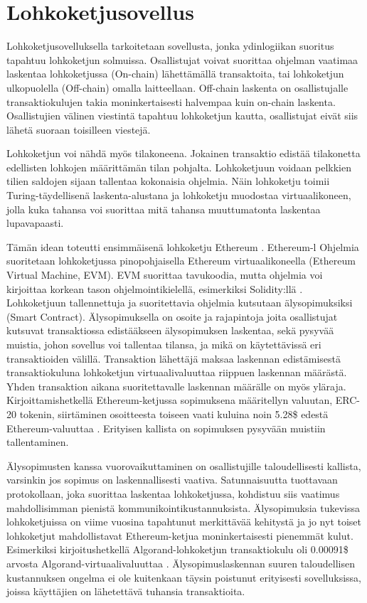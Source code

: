 \section{Lohkoketjusovellus}

Lohkoketjusovelluksella tarkoitetaan sovellusta, jonka ydinlogiikan suoritus tapahtuu lohkoketjun solmuissa. Osallistujat voivat suorittaa ohjelman vaatimaa laskentaa lohkoketjussa (On-chain) lähettämällä transaktoita, tai lohkoketjun ulkopuolella (Off-chain) omalla laitteellaan. Off-chain laskenta on osallistujalle transaktiokulujen takia moninkertaisesti halvempaa kuin on-chain laskenta. Osallistujien välinen viestintä tapahtuu lohkoketjun kautta, osallistujat eivät siis lähetä suoraan toisilleen viestejä.

Lohkoketjun voi nähdä myös tilakoneena. Jokainen transaktio edistää tilakonetta edellisten lohkojen määrittämän tilan pohjalta. Lohkoketjuun voidaan pelkkien tilien saldojen sijaan tallentaa kokonaisia ohjelmia. Näin lohkoketju toimii Turing-täydellisenä laskenta-alustana ja lohkoketju muodostaa virtuaalikoneen, jolla kuka tahansa voi suorittaa mitä tahansa muuttumatonta laskentaa lupavapaasti.

Tämän idean toteutti ensimmäisenä lohkoketju Ethereum \cite{buterin_ethereum_2014}. Ethereum-l
Ohjelmia suoritetaan lohkoketjussa pinopohjaisella Ethereum virtuaalikoneella (Ethereum Virtual Machine, EVM). EVM suorittaa tavukoodia, mutta ohjelmia voi kirjoittaa korkean tason ohjelmointikielellä, esimerkiksi Solidity:llä \cite{noauthor_solidity_nodate}. Lohkoketjuun tallennettuja ja suoritettavia ohjelmia kutsutaan älysopimuksiksi (Smart Contract).  Älysopimuksella on osoite ja rajapintoja joita osallistujat kutsuvat transaktiossa edistääkseen älysopimuksen laskentaa, sekä pysyvää muistia, johon sovellus voi tallentaa tilansa, ja mikä on käytettävissä eri transaktioiden välillä. Transaktion lähettäjä maksaa laskennan edistämisestä transaktiokuluna lohkoketjun virtuaalivaluuttaa riippuen laskennan määrästä. Yhden transaktion aikana suoritettavalle laskennan määrälle on myös yläraja. Kirjoittamishetkellä Ethereum-ketjussa sopimuksena määritellyn valuutan, ERC-20 tokenin, siirtäminen osoitteesta toiseen vaati kuluina noin 5.28\$ edestä Ethereum-valuuttaa \cite{etherscanio_ethereum_nodate}. Erityisen kallista on sopimuksen pysyvään muistiin tallentaminen.

Älysopimusten kanssa vuorovaikuttaminen on osallistujille taloudellisesti kallista, varsinkin jos sopimus on laskennallisesti vaativa. Satunnaisuutta tuottavaan protokollaan, joka suorittaa laskentaa lohkoketjussa, kohdistuu siis vaatimus mahdollisimman pienistä kommunikointikustannuksista. Älysopimuksia tukevissa lohkoketjuissa on viime vuosina tapahtunut merkittävää kehitystä ja jo nyt toiset lohkoketjut mahdollistavat Ethereum-ketjua moninkertaisesti pienemmät kulut. Esimerkiksi kirjoitushetkellä Algorand-lohkoketjun transaktiokulu oli 0.00091\$ arvosta Algorand-virtuaalivaluuttaa \cite{noauthor_algorand_nodate}. Älysopimuslaskennan suuren taloudellisen kustannuksen ongelma ei ole kuitenkaan täysin poistunut erityisesti sovelluksissa, joissa käyttäjien on lähetettävä tuhansia transaktioita.

